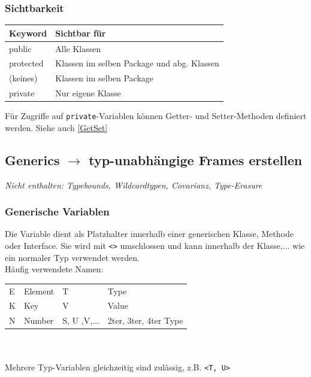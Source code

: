 {    \subsubsection{Sichtbarkeit}
        \vspace{-0.1cm}
        \begin{center}
            \begin{tabular}{ll}
                \rowcolor[RGB]{239,239,239} 
                \textbf{Keyword} & \textbf{Sichtbar für} \\ \hline
                public & Alle Klassen \\
                protected & Klassen im selben Package und abg. Klassen\\
                (keines) & Klassen im selben Package \\
                private & Nur eigene Klasse \\
            \end{tabular}
        \end{center}
        \vspace{-0.2cm}

        Für Zugriffe auf \verb|private|-Variablen können Getter- und Setter-Methoden definiert werden. Siehe auch \ref{GetSet}
        \vspace{-0.1cm} 


\subsection{Generics $\rightarrow$ typ-unabhängige Frames erstellen}
    \vspace{-0.1cm}
    {\small \textit{Nicht enthalten: Typebounds, Wildcardtypen, Covarianz, Type-Erasure}}
    \vspace{-0.1cm} 

    \subsubsection{Generische Variablen}
        Die Variable dient als Platzhalter innerhalb einer generischen Klasse, Methode oder Interface. Sie wird mit \verb|<>| umschlossen 
        und kann innerhalb der Klasse,... wie ein normaler Typ verwendet werden.\\
        Häufig verwendete Namen:\\
        \begin{tabular}{l l|l l}\hline
            E & Element & T & Type\\
            K & Key     & V & Value\\
            N & Number  & S, U ,V,... & 2ter, 3ter, 4ter Type \\\hline
        \end{tabular}\\
        \\
        Mehrere Typ-Variablen gleichzeitig sind zulässig, z.B. \verb|<T, U>|
        \vspace{-0.1cm}

}
